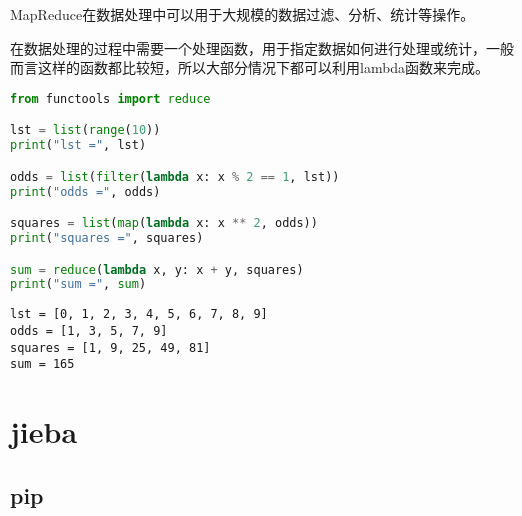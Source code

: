 MapReduce在数据处理中可以用于大规模的数据过滤、分析、统计等操作。\\

\begin{table}[H]
    \centering
    \caption{MapReduce数据处理函数}
\end{table}

在数据处理的过程中需要一个处理函数，用于指定数据如何进行处理或统计，一般而言这样的函数都比较短，所以大部分情况下都可以利用lambda函数来完成。\\


\begin{lstlisting}[language=Python]
from functools import reduce

lst = list(range(10))
print("lst =", lst)

odds = list(filter(lambda x: x % 2 == 1, lst))
print("odds =", odds)

squares = list(map(lambda x: x ** 2, odds))
print("squares =", squares)

sum = reduce(lambda x, y: x + y, squares)
print("sum =", sum)
\end{lstlisting}

\begin{tcolorbox}
    \begin{verbatim}
lst = [0, 1, 2, 3, 4, 5, 6, 7, 8, 9]
odds = [1, 3, 5, 7, 9]
squares = [1, 9, 25, 49, 81]
sum = 165
\end{verbatim}
\end{tcolorbox}

\newpage

\section{jieba}

\subsection{pip}

